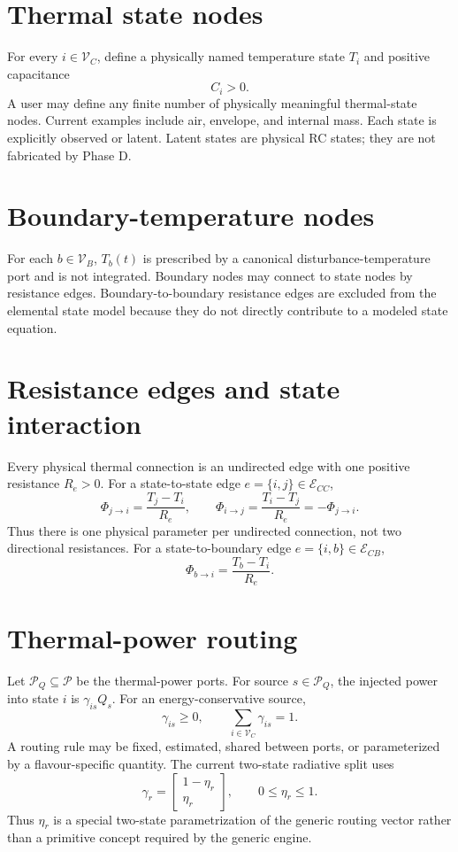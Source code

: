 \documentclass[11pt]{article}
\newcommand{\Vc}{\mathcal{V}_{C}}
\newcommand{\Vb}{\mathcal{V}_{B}}
\newcommand{\Ecc}{\mathcal{E}_{CC}}
\newcommand{\Ecb}{\mathcal{E}_{CB}}
\newcommand{\Pset}{\mathcal{P}}
\newcommand{\PQ}{\mathcal{P}_{Q}}
\begin{document}
\section{Thermal state nodes}
For every $i\in\Vc$, define a physically named temperature state $T_i$ and positive capacitance
\[
\boxed{C_i>0.}
\]
A user may define any finite number of physically meaningful thermal-state nodes. Current examples include air, envelope, and internal mass. Each state is explicitly observed or latent. Latent states are physical RC states; they are not fabricated by Phase D.

\section{Boundary-temperature nodes}
For each $b\in\Vb$, $T_b(t)$ is prescribed by a canonical disturbance-temperature port and is not integrated. Boundary nodes may connect to state nodes by resistance edges. Boundary-to-boundary resistance edges are excluded from the elemental state model because they do not directly contribute to a modeled state equation.

\section{Resistance edges and state interaction}
Every physical thermal connection is an undirected edge with one positive resistance $R_e>0$. For a state-to-state edge $e=\{i,j\}\in\Ecc$,
\[
\boxed{\Phi_{j\rightarrow i}=\frac{T_j-T_i}{R_e}},\qquad
\Phi_{i\rightarrow j}=\frac{T_i-T_j}{R_e}=-\Phi_{j\rightarrow i}.
\]
Thus there is one physical parameter per undirected connection, not two directional resistances. For a state-to-boundary edge $e=\{i,b\}\in\Ecb$,
\[
\boxed{\Phi_{b\rightarrow i}=\frac{T_b-T_i}{R_e}.}
\]

\section{Thermal-power routing}
Let $\PQ\subseteq\Pset$ be the thermal-power ports. For source $s\in\PQ$, the injected power into state $i$ is $\gamma_{is}Q_s$. For an energy-conservative source,
\[
\boxed{\gamma_{is}\ge0,\qquad \sum_{i\in\Vc}\gamma_{is}=1.}
\]
A routing rule may be fixed, estimated, shared between ports, or parameterized by a flavour-specific quantity. The current two-state radiative split uses
\[
\boxed{\gamma_r=\begin{bmatrix}1-\eta_r\\\eta_r\end{bmatrix},\qquad 0\le\eta_r\le1.}
\]
Thus $\eta_r$ is a special two-state parametrization of the generic routing vector rather than a primitive concept required by the generic engine.
\end{document}
